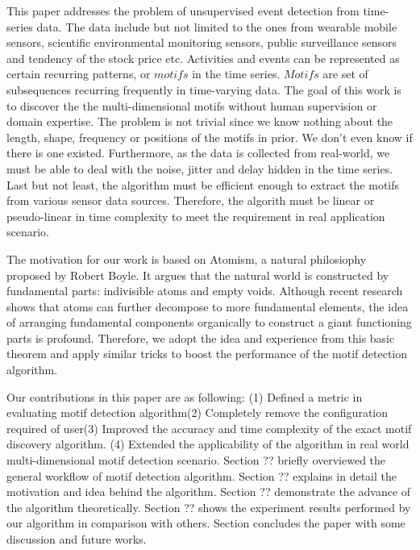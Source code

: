 \documentclass{article}
\begin{document}
This paper addresses the problem of unsupervised event detection from time-series data. The data include but not limited to the ones from wearable mobile sensors, scientific environmental monitoring sensors, public surveillance sensors and tendency of the stock price etc. Activities and events can be represented as certain recurring patterns, or $motifs$ in the time series. $Motifs$ are set of subsequences recurring frequently in time-varying data. The goal of this work is to discover the the multi-dimensional motifs without human supervision or domain expertise. The problem is not trivial since we know nothing about the length, shape, frequency or positions of the motifs in prior. We don't even know if there is one existed. Furthermore, as the data is collected from real-world, we must be able to deal with the noise, jitter and delay hidden in the time series. Last but not least, the algorithm must be efficient enough to extract the motifs from various sensor data sources. Therefore, the algorith must be linear or pseudo-linear in time complexity to meet the requirement in real application scenario. 

The motivation for our work is based on Atomism, a natural philosiophy proposed by Robert Boyle. It argues that the natural world is constructed by fundamental parts: indivisible atoms and empty voids. Although recent research shows that atoms can further decompose to more fundamental elements, the idea of arranging fundamental components organically to construct a giant functioning parts is profound. Therefore, we adopt the idea and experience from this basic theorem and apply similar tricks to boost the performance of the motif detection algorithm. 

Our contributions in this paper are as following: (1) Defined a metric in evaluating motif detection algorithm(2) Completely remove the configuration required of user(3) Improved the accuracy and time complexity of the exact motif discovery algorithm. (4) Extended the applicability of the algorithm in real world multi-dimensional motif detection scenario. Section ?? briefly overviewed the general workflow of motif detection algorithm. Section ?? explains in detail the motivation and idea behind the algorithm. Section ?? demonstrate the advance of the algorithm theoretically. Section ?? shows the experiment results performed by our algorithm in comparison with others. Section concludes the paper with some discussion and future works. 
\end{document}
